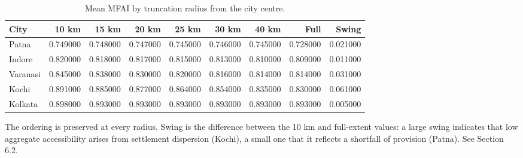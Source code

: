 \begin{table}[htbp]
\centering
\small
\caption{Mean MFAI by truncation radius from the city centre.}
\label{tab:t7_truncation}
\begin{tabular}{lrrrrrrrr}
\toprule
City & 10 km & 15 km & 20 km & 25 km & 30 km & 40 km & Full & Swing \\
\midrule
Patna & 0.749000 & 0.748000 & 0.747000 & 0.745000 & 0.746000 & 0.745000 & 0.728000 & 0.021000 \\
Indore & 0.820000 & 0.818000 & 0.817000 & 0.815000 & 0.813000 & 0.810000 & 0.809000 & 0.011000 \\
Varanasi & 0.845000 & 0.838000 & 0.830000 & 0.820000 & 0.816000 & 0.814000 & 0.814000 & 0.031000 \\
Kochi & 0.891000 & 0.885000 & 0.877000 & 0.864000 & 0.854000 & 0.835000 & 0.830000 & 0.061000 \\
Kolkata & 0.898000 & 0.893000 & 0.893000 & 0.893000 & 0.893000 & 0.893000 & 0.893000 & 0.005000 \\
\bottomrule
\end{tabular}
\begin{tablenotes}\footnotesize
\item The ordering is preserved at every radius. Swing is the difference between the 10 km and full-extent values: a large swing indicates that low aggregate accessibility arises from settlement dispersion (Kochi), a small one that it reflects a shortfall of provision (Patna). See Section 6.2.
\end{tablenotes}
\end{table}
